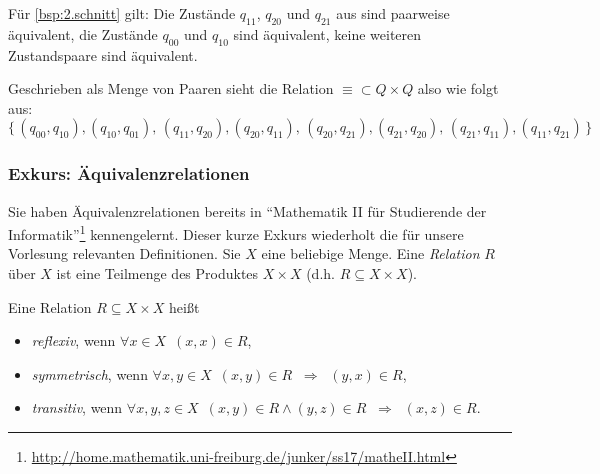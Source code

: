 \begin{Bsp}
Für \autoref{bsp:2.schnitt} gilt: 
Die Zustände $q_{11}$, $q_{20}$ und $q_{21}$ aus sind paarweise äquivalent,
die Zustände $q_{00}$ und $q_{10}$ sind äquivalent,
keine weiteren Zustandspaare sind äquivalent.

Geschrieben als Menge von Paaren sieht die Relation $\equiv\subset Q\times Q$ also wie folgt aus:
$$\{ \,
(q_{00}, q_{10}), (q_{10}, q_{01}), \,
(q_{11}, q_{20}), (q_{20}, q_{11}), \,
(q_{20}, q_{21}), (q_{21}, q_{20}), \,
(q_{21}, q_{11}), (q_{11}, q_{21}) \,
\}$$
\end{Bsp}


\subsubsection{Exkurs: Äquivalenzrelationen}
Sie haben Äquivalenzrelationen bereits in ``Mathematik II für Studierende der Informatik''\footnote{\url{http://home.mathematik.uni-freiburg.de/junker/ss17/matheII.html}} kennengelernt.
Dieser kurze Exkurs wiederholt die für unsere Vorlesung relevanten Definitionen.
Sie $X$ eine beliebige Menge. Eine \emph{Relation} $R$ über $X$ ist eine Teilmenge des Produktes $X\times X$ (d.h. $R\subseteq X\times X$).

Eine Relation $R\subseteq X\times X$ heißt
\begin{itemize}
 \item \emph{reflexiv}, wenn $\forall x\in X$\ $(x,x)\in R$, 
 \item \emph{symmetrisch}, wenn $\forall x, y\in X$\ $(x,y)\in R \;\; \Rightarrow\;\; (y,x)\in R$, 
 \item \emph{transitiv}, wenn $\forall x, y, z\in X$\ $(x,y)\in R \land (y,z)\in R\;\; \Rightarrow\;\; (x,z)\in R$.
\end{itemize}

